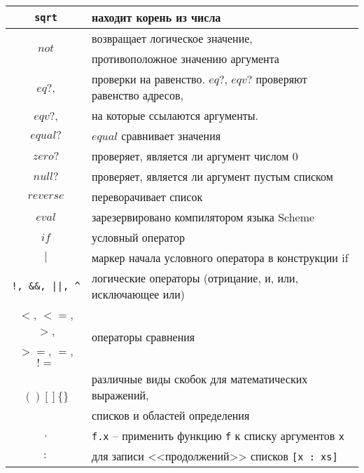 \begin{itemize}
\begin{table}[ht!]
\begin{tabular}{|c|l|}
                    \verb!sqrt!                 & находит корень из числа \\ \hline
                    \multirow{2}{*}{$not$}      & возвращает логическое значение,\\
                                                & противоположное значению аргумента \\ \hline
                    $eq?$,                      & проверки на равенство. $eq?$, $eqv?$ проверяют равенство адресов,\\
                    $eqv?$,                     & на которые ссылаются аргументы.\\
                    $equal?$                    & $equal$ сравнивает значения \\ \hline
                    $zero?$                     & проверяет, является ли аргумент числом 0 \\ \hline
                    $null?$                     & проверяет, является ли аргумент пустым списком \\ \hline
                    $reverse$                   & переворачивает список \\ \hline
                    $eval$                      & зарезервировано компилятором языка Scheme \\ \hline
                    $if$                        & условный оператор \\ \hline
                    $|$                         & маркер начала условного оператора в конструкции if \\ \hline
                    \verb$!, &&, ||, ^$         & логические операторы (отрицание, и, или, исключающее или) \\ \hline
                    $<$, $<=$, $>$,             & \multirow{2}{*}{операторы сравнения} \\
                    $>=$, $=$, $!=$             & \\ \hline
                    \multirow{2}{*}{$( ) [ ] \{ \}$} & различные виды скобок для математических выражений,\\
                                                & списков и областей определения} \\ \hline
                    $.$                         & \verb,f.x, -- применить функцию \verb,f, к списку аргументов \verb,x, \\ \hline
                    $:$                         & для записи <<продолжений>> списков \verb,[x : xs], \\ \hline

\end{tabular}
\end{table}
\end{itemize}
